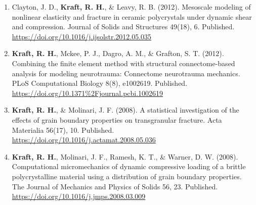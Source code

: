 \documentclass[a4paper,10pt]{article}
\begin{document}
\begin{enumerate}
 \item	Clayton, J. D., \textbf{\textbf{Kraft,} R. H.}, \&
 Leavy, R. B. (2012). Mesoscale modeling of nonlinear elasticity and fracture in ceramic polycrystals under dynamic shear and compression. Journal of Solids and Structures 49(18), 6. Published. \url{https://doi.org/10.1016/j.ijsolstr.2012.05.035}
 \item	\textbf{\textbf{Kraft,} R. H.}, Mckee, P. J., Dagro, A. M., \&
 Grafton, S. T. (2012). Combining the finite element method with structural connectome-based analysis for modeling neurotrauma: Connectome neurotrauma mechanics. PLoS Computational Biology 8(8), e1002619. Published. \url{https://doi.org/10.1371%2Fjournal.pcbi.1002619}
 \item	\textbf{\textbf{Kraft,} R. H.}, \&
 Molinari, J. F. (2008). A statistical investigation of the effects of grain boundary properties on transgranular fracture. Acta Materialia 56(17), 10. Published. \url{https://doi.org/10.1016/j.actamat.2008.05.036}
 \item	\textbf{\textbf{Kraft,} R. H.}, Molinari, J. F., Ramesh, K. T., \&
 Warner, D. W. (2008). Computational micromechanics of dynamic compressive loading of a brittle polycrystalline material using a distribution of grain boundary properties. The Journal of Mechanics and Physics of Solids 56, 23. Published. \url{https://doi.org/10.1016/j.jmps.2008.03.009}

    \end{enumerate}
    
\end{document}
